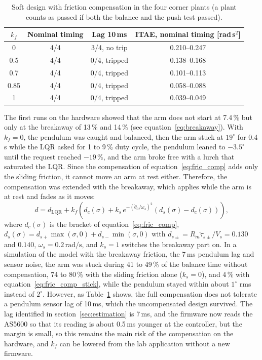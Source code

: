 \documentclass[a4paper,11pt]{article}
\begin{document}
\begin{table}[h]
\centering
\caption{Soft design with friction compensation in the four corner plants (a plant counts as passed if both the balance and the push test passed).}
\label{tab:lqr_fric}
\small
\begin{tabular}{@{}cccc@{}}
\toprule
$k_f$ & Nominal timing & Lag 10\,ms & ITAE, nominal timing [rad\,s$^2$] \\
\midrule
0 & 4/4 & 3/4, no trip & 0.210--0.247 \\
0.5 & 4/4 & 0/4, tripped & 0.138--0.168 \\
0.7 & 4/4 & 0/4, tripped & 0.101--0.113 \\
0.85 & 4/4 & 0/4, tripped & 0.058--0.088 \\
1 & 4/4 & 0/4, tripped & 0.039--0.049 \\
\bottomrule
\end{tabular}
\end{table}

The first runs on the hardware showed that the arm does not start at 7.4\,\% but only at the breakaway of 13\,\% and 14\,\% (see equation~\ref{eq:breakaway}). With $k_f = 0$, the pendulum was caught and balanced, then the arm stuck at $19^\circ$ for 0.4\,s while the LQR asked for 1 to 9\,\% duty cycle, the pendulum leaned to $-3.5^\circ$ until the request reached $-19\,\%$, and the arm broke free with a lurch that saturated the LQR. Since the compensation of equation~\ref{eq:fric_comp} adds only the sliding friction, it cannot move an arm at rest either. Therefore, the compensation was extended with the breakaway, which applies while the arm is at rest and fades as it moves:
\begin{equation}
  d = d_{\mathrm{LQR}} + k_f \left( d_c(\sigma) + k_s\, e^{-(\dot\theta_0/\omega_s)^2} \left( d_s(\sigma) - d_c(\sigma) \right) \right),
  \label{eq:fric_comp_stick}
\end{equation}
where $d_c(\sigma)$ is the bracket of equation~\ref{eq:fric_comp}, $d_s(\sigma) = d_{s+}\max(\sigma, 0) + d_{s-}\min(\sigma, 0)$ with $d_{s\pm} = R_m \tilde\tau_{s\pm}/V_s = 0.130$ and $0.140$, $\omega_s = 0.2\,\mathrm{rad/s}$, and $k_s = 1$ switches the breakaway part on. In a simulation of the model with the breakaway friction, the 7\,ms pendulum lag and sensor noise, the arm was stuck during 41 to 49\,\% of the balance time without compensation, 74 to 80\,\% with the sliding friction alone ($k_s = 0$), and 4\,\% with equation~\ref{eq:fric_comp_stick}, while the pendulum stayed within about $1^\circ$ rms instead of $2^\circ$. However, as Table~\ref{tab:lqr_fric} shows, the full compensation does not tolerate a pendulum sensor lag of 10\,ms, which the uncompensated design survived. The lag identified in section~\ref{sec:estimation} is 7\,ms, and the firmware now reads the AS5600 so that its reading is about 0.5\,ms younger at the controller, but the margin is small, so this remains the main risk of the compensation on the hardware, and $k_f$ can be lowered from the lab application without a new firmware.
\end{document}
